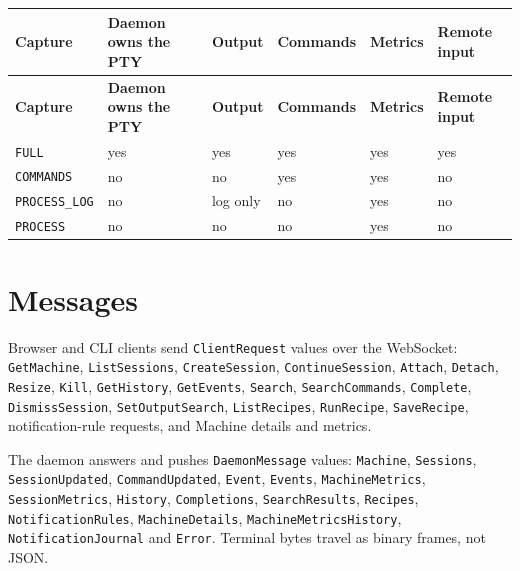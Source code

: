 \begin{small}
\begin{longtable}{>{\raggedright\arraybackslash}p{0.164\dimexpr \linewidth-12\tabcolsep\relax}>{\raggedright\arraybackslash}p{0.222\dimexpr \linewidth-12\tabcolsep\relax}>{\raggedright\arraybackslash}p{0.154\dimexpr \linewidth-12\tabcolsep\relax}>{\raggedright\arraybackslash}p{0.154\dimexpr \linewidth-12\tabcolsep\relax}>{\raggedright\arraybackslash}p{0.154\dimexpr \linewidth-12\tabcolsep\relax}>{\raggedright\arraybackslash}p{0.154\dimexpr \linewidth-12\tabcolsep\relax}}
\toprule
\textbf{Capture} & \textbf{Daemon owns the PTY} & \textbf{Output} & \textbf{Commands} & \textbf{Metrics} & \textbf{Remote input} \\
\midrule
\endfirsthead
\toprule
\textbf{Capture} & \textbf{Daemon owns the PTY} & \textbf{Output} & \textbf{Commands} & \textbf{Metrics} & \textbf{Remote input} \\
\midrule
\endhead
\texttt{FULL} & yes & yes & yes & yes & yes \\
\texttt{COMMANDS} & no & no & yes & yes & no \\
\texttt{PROCESS\_\allowbreak{}LOG} & no & log only & no & yes & no \\
\texttt{PROCESS} & no & no & no & yes & no \\
\bottomrule
\end{longtable}
\end{small}

\section{\texorpdfstring{Messages}{Messages}}

Browser and CLI clients send \texttt{ClientRequest} values over the WebSocket: \texttt{GetMachine}, \texttt{ListSessions}, \texttt{CreateSession}, \texttt{ContinueSession}, \texttt{Attach}, \texttt{Detach}, \texttt{Resize}, \texttt{Kill}, \texttt{GetHistory}, \texttt{GetEvents}, \texttt{Search}, \texttt{SearchCommands}, \texttt{Complete}, \texttt{DismissSession}, \texttt{SetOutputSearch}, \texttt{ListRecipes}, \texttt{RunRecipe}, \texttt{SaveRecipe}, notification-rule requests, and Machine details and metrics.

The daemon answers and pushes \texttt{DaemonMessage} values: \texttt{Machine}, \texttt{Sessions}, \texttt{SessionUpdated}, \texttt{CommandUpdated}, \texttt{Event}, \texttt{Events}, \texttt{MachineMetrics}, \texttt{SessionMetrics}, \texttt{History}, \texttt{Completions}, \texttt{SearchResults}, \texttt{Recipes}, \texttt{NotificationRules}, \texttt{MachineDetails}, \texttt{MachineMetricsHistory}, \texttt{NotificationJournal} and \texttt{Error}. Terminal bytes travel as binary frames, not JSON.

